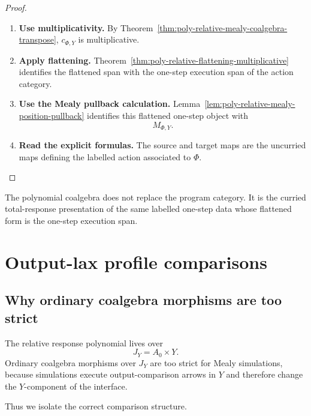 \begin{proof}
\leavevmode
\begin{enumerate}
\item \textbf{Use multiplicativity.}
By Theorem~\ref{thm:poly-relative-mealy-coalgebra-transpose},
\(c_{\Phi,Y}\) is multiplicative.

\item \textbf{Apply flattening.}
Theorem~\ref{thm:poly-relative-flattening-multiplicative} identifies the
flattened span with the one-step execution span of the action category.

\item \textbf{Use the Mealy pullback calculation.}
Lemma~\ref{lem:poly-relative-mealy-position-pullback} identifies this flattened
one-step object with
\[
M_{\Phi,Y}.
\]

\item \textbf{Read the explicit formulas.}
The source and target maps are the uncurried maps defining the labelled action
associated to \(\Phi\).
\end{enumerate}
\end{proof}

\begin{remark}
\label{rem:poly-relative-polynomial-not-replacement}
The polynomial coalgebra does not replace the program category.  It is the
curried total-response presentation of the same labelled one-step data whose
flattened form is the one-step execution span.
\end{remark}

\section{Output-lax profile comparisons}
\label{sec:poly-relative-output-lax-profile-comparisons}

\subsection{Why ordinary coalgebra morphisms are too strict}
\label{subsec:poly-relative-ordinary-morphisms-too-strict}

The relative response polynomial lives over
\[
J_Y=A_0\times Y.
\]
Ordinary coalgebra morphisms over \(J_Y\) are too strict for Mealy simulations,
because simulations execute output-comparison arrows in \(Y\) and therefore
change the \(Y\)-component of the interface.

Thus we isolate the correct comparison structure.

